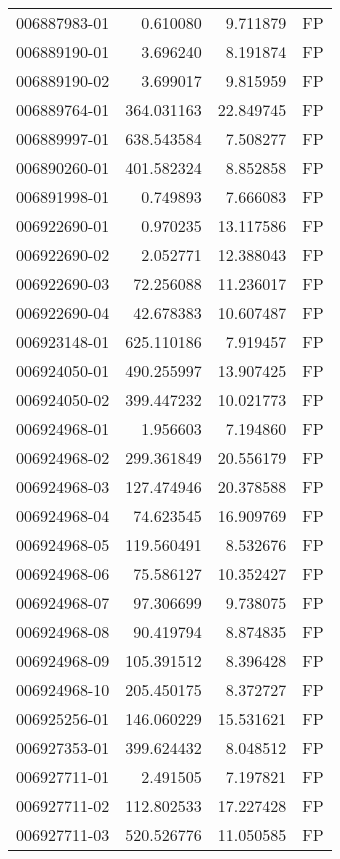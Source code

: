 \begin{tabular}{lrrl}
006887983-01 &    0.610080 &     9.711879 &   FP \\
006889190-01 &    3.696240 &     8.191874 &   FP \\
006889190-02 &    3.699017 &     9.815959 &   FP \\
006889764-01 &  364.031163 &    22.849745 &   FP \\
006889997-01 &  638.543584 &     7.508277 &   FP \\
006890260-01 &  401.582324 &     8.852858 &   FP \\
006891998-01 &    0.749893 &     7.666083 &   FP \\
006922690-01 &    0.970235 &    13.117586 &   FP \\
006922690-02 &    2.052771 &    12.388043 &   FP \\
006922690-03 &   72.256088 &    11.236017 &   FP \\
006922690-04 &   42.678383 &    10.607487 &   FP \\
006923148-01 &  625.110186 &     7.919457 &   FP \\
006924050-01 &  490.255997 &    13.907425 &   FP \\
006924050-02 &  399.447232 &    10.021773 &   FP \\
006924968-01 &    1.956603 &     7.194860 &   FP \\
006924968-02 &  299.361849 &    20.556179 &   FP \\
006924968-03 &  127.474946 &    20.378588 &   FP \\
006924968-04 &   74.623545 &    16.909769 &   FP \\
006924968-05 &  119.560491 &     8.532676 &   FP \\
006924968-06 &   75.586127 &    10.352427 &   FP \\
006924968-07 &   97.306699 &     9.738075 &   FP \\
006924968-08 &   90.419794 &     8.874835 &   FP \\
006924968-09 &  105.391512 &     8.396428 &   FP \\
006924968-10 &  205.450175 &     8.372727 &   FP \\
006925256-01 &  146.060229 &    15.531621 &   FP \\
006927353-01 &  399.624432 &     8.048512 &   FP \\
006927711-01 &    2.491505 &     7.197821 &   FP \\
006927711-02 &  112.802533 &    17.227428 &   FP \\
006927711-03 &  520.526776 &    11.050585 &   FP \\

\end{tabular}
